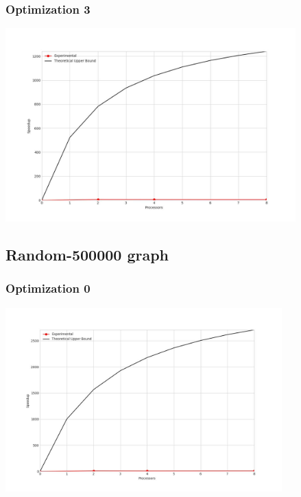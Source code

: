 \subsubsection{Optimization 3}
\begin{center}
    \resizebox{0.95\textwidth}{!}{}
    \includegraphics[width=0.84\textwidth]{../img/speedup-graph_type-random-250000-O3}
\end{center}

\clearpage
\subsection{Random-500000 graph}
\subsubsection{Optimization 0}
\begin{center}
    \resizebox{0.95\textwidth}{!}{}
    \includegraphics[width=0.8\textwidth]{../img/speedup-graph_type-random-500000-O0}
\end{center}

